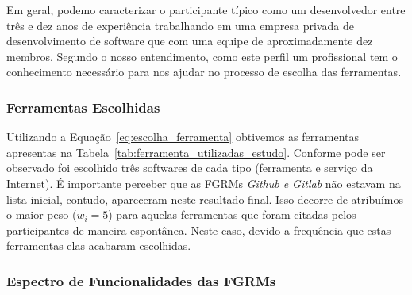 Em geral, podemo caracterizar o participante típico como um desenvolvedor entre
três e dez anos de experiência trabalhando em uma empresa privada de
desenvolvimento de software que com uma equipe de aproximadamente dez membros.
Segundo o nosso entendimento, como este perfil um profissional tem o
conhecimento necessário para nos ajudar no processo de escolha das ferramentas.

\subsubsection{Ferramentas Escolhidas}
\label{subsec:resultados_ferramentas_escolhidas}

Utilizando a Equação~\ref{eq:escolha_ferramenta} obtivemos as ferramentas
apresentas na Tabela~\ref{tab:ferramenta_utilizadas_estudo}. Conforme pode ser
observado foi escolhido três softwares de cada tipo (ferramenta e serviço da
Internet). É importante perceber que as FGRMs \textit{Github e Gitlab} não
estavam na lista inicial, contudo, apareceram neste resultado final. Isso
decorre  de atribuímos o maior peso ($w_i = 5$) para aquelas ferramentas que
foram citadas pelos participantes de maneira espontânea.  Neste caso, devido a
frequência que estas ferramentas elas acabaram escolhidas.

\begin{table}[htpb]
\centering
{}
\caption{Ferramentas utilizados no estudo}
\label{tab:ferramenta_utilizadas_estudo}
\end{table}


\subsubsection{Espectro de Funcionalidades das FGRMs}
\label{subsec:categorizacao_ferramentas}

